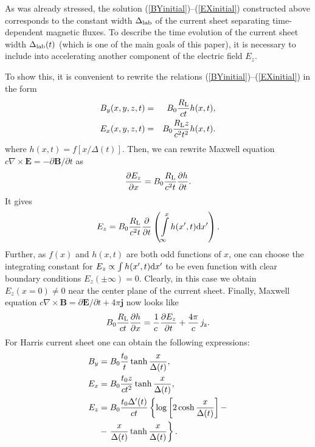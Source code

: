 \documentclass[useAMS,usenatbib]{mn2e}
\begin{document}
As was already stressed, the solution (\ref{BYinitial})--(\ref{EXinitial}) 
constructed above corresponds to the constant width $\Delta_{\rm lab}$ of the current 
sheet separating time-dependent magnetic fluxes. To describe the time evolution 
of the  current sheet width $\Delta_{\rm lab}(t)$ (which is one of the main goals of this paper),
it is necessary to include into accelerating another component of the electric
field $E_{z}$.

To show this, it is convenient to rewrite the relations (\ref{BYinitial})--(\ref{EXinitial}) 
in the form
\begin{eqnarray}
B_{y}(x, y, z, t) & = & B_{0}\frac{R_{\rm L}}{c t} h(x,t),
\label{BYin} \\
E_{x}(x, y, z, t) & = & B_{0}\frac{R_{\rm L} z}{c^2 t^2} h(x,t).
\label{EXin}
\end{eqnarray}
where $h(x,t)=f[x/\Delta(t)]$. Then, we can rewrite Maxwell equation 
$c \nabla \times {\boldsymbol E} = - \partial {\boldsymbol B}/\partial t$  as
\begin{equation}
\frac{\partial E_{z}}{\partial x} 
= B_{0}\frac{R_{\rm L}}{c^2 t} \frac{\partial h}{\partial t}. 
\end{equation}
It gives
\begin{equation}
E_{z}
= B_{0}\frac{R_{\rm L}}{c^2 t} \frac{\partial}{\partial t}\left(\int\limits^{x}_{\infty} h(x',t){\rm d}x'\right). 
\end{equation}
Further, as $f(x)$ and $h(x,t)$ are both odd functions of $x$, 
one can choose the integrating constant for $E_{z} \propto \int h(x',t){\rm d}x'$
to be even function with clear boundary conditions $E_{z}(\pm \infty) = 0$. Clearly, in this case 
we obtain $E_{z}(x=0)\neq 0$ near the center plane of the current sheet. Finally, Maxwell equation 
$c \nabla \times {\boldsymbol B} =  \partial {\boldsymbol E}/\partial t + 4 \pi {\boldsymbol j}$ 
now looks like
\begin{equation}
\label{eqn:ez}
B_{0}\frac{R_{\rm L}}{c t} \frac{\partial h}{\partial x} 
= \frac{1}{c \, }\frac{\partial E_{z}}{\partial t} + \frac{4 \pi}{c} \, j_{\rm z}. 
\end{equation}
For Harris current sheet one can obtain the following expressions:
\begin{align}
B_{y} & =  B_{0} \frac{t_0}{t}\tanh\dfrac{x}{\Delta(t)},
\label{ByOrt}\\
E_{x}  & =   B_{0} \frac{t_0z}{ct^2}\tanh\dfrac{x}{\Delta(t)},
\label{ExOrt}\\
E_{z} & =  B_{0} \frac{t_0\Delta'(t)}{ct}\left\{\log\left[2\cosh\dfrac{x}{\Delta(t)}\right]-
\right. \label{EzOrt} \\
&- \left.\dfrac{x}{\Delta(t)}\tanh\dfrac{x}{\Delta(t)}\right\}.
\notag
\end{align}
\end{document}
